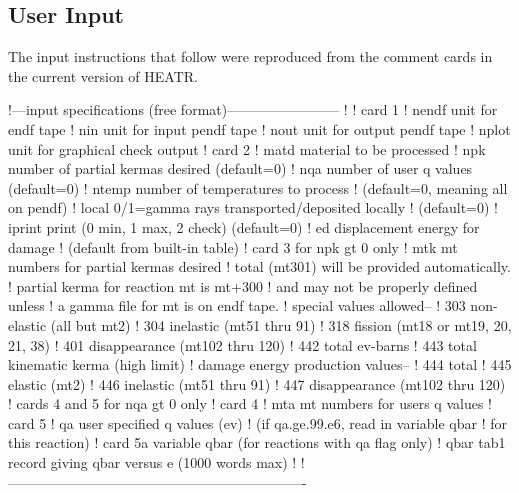 \subsection{User Input}
\label{ssHEATR_inp}

The input instructions that follow were reproduced from the
comment cards in the current version of HEATR.

\small
\begin{ccode}

   !---input specifications (free format)------------------------
   !
   ! card 1
   !    nendf    unit for endf tape
   !    nin      unit for input pendf tape
   !    nout     unit for output pendf tape
   !    nplot    unit for graphical check output
   ! card 2
   !    matd     material to be processed
   !    npk      number of partial kermas desired (default=0)
   !    nqa      number of user q values (default=0)
   !    ntemp    number of temperatures to process
   !             (default=0, meaning all on pendf)
   !    local    0/1=gamma rays transported/deposited locally
   !             (default=0)
   !    iprint   print (0 min, 1 max, 2 check) (default=0)
   !    ed       displacement energy for damage
   !             (default from built-in table)
   ! card 3      for npk gt 0 only
   !    mtk      mt numbers for partial kermas desired
   !             total (mt301) will be provided automatically.
   !             partial kerma for reaction mt is mt+300
   !             and may not be properly defined unless
   !             a gamma file for mt is on endf tape.
   !             special values allowed--
   !               303   non-elastic (all but mt2)
   !               304   inelastic (mt51 thru 91)
   !               318   fission (mt18 or mt19, 20, 21, 38)
   !               401   disappearance (mt102 thru 120)
   !               442   total ev-barns
   !               443   total kinematic kerma (high limit)
   !             damage energy production values--
   !               444   total
   !               445   elastic (mt2)
   !               446   inelastic (mt51 thru 91)
   !               447   disappearance (mt102 thru 120)
   !          cards 4 and 5 for nqa gt 0 only
   ! card 4
   !    mta      mt numbers for users q values
   ! card 5
   !    qa       user specified q values (ev)
   !               (if qa.ge.99.e6, read in variable qbar
   !                  for this reaction)
   ! card 5a     variable qbar (for reactions with qa flag only)
   !    qbar      tab1 record giving qbar versus e (1000 words max)
   !
   !----------------------------------------------------------------

\end{ccode}
\normalsize

